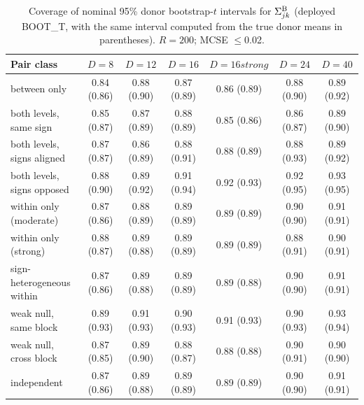 \begin{table}[h]\centering\footnotesize
\caption{Coverage of nominal 95\% donor bootstrap-$t$ intervals for $\Sigma^{\mathrm{B}}_{jk}$ (deployed BOOT\_T, with the same interval computed from the true donor means in parentheses). $R=200$; MCSE $\le$0.02.}\label{tab:cov}
\begin{tabular}{lcccccc}
\hline
Pair class & $D=8$ & $D=12$ & $D=16$ & $D=16 strong$ & $D=24$ & $D=40$\\
\hline
between only & 0.84 (0.86) & 0.88 (0.90) & 0.87 (0.89) & 0.86 (0.89) & 0.88 (0.90) & 0.89 (0.92)\\
both levels, same sign & 0.85 (0.87) & 0.87 (0.89) & 0.88 (0.89) & 0.85 (0.86) & 0.86 (0.87) & 0.89 (0.90)\\
both levels, signs aligned & 0.87 (0.87) & 0.86 (0.89) & 0.88 (0.91) & 0.88 (0.89) & 0.88 (0.93) & 0.89 (0.92)\\
both levels, signs opposed & 0.88 (0.90) & 0.89 (0.92) & 0.91 (0.94) & 0.92 (0.93) & 0.92 (0.95) & 0.93 (0.95)\\
within only (moderate) & 0.87 (0.86) & 0.88 (0.89) & 0.89 (0.89) & 0.89 (0.89) & 0.90 (0.90) & 0.91 (0.91)\\
within only (strong) & 0.88 (0.87) & 0.89 (0.88) & 0.89 (0.89) & 0.89 (0.89) & 0.88 (0.91) & 0.90 (0.91)\\
sign-heterogeneous within & 0.87 (0.86) & 0.89 (0.88) & 0.89 (0.89) & 0.89 (0.88) & 0.90 (0.90) & 0.91 (0.91)\\
weak null, same block & 0.89 (0.93) & 0.91 (0.93) & 0.90 (0.93) & 0.91 (0.93) & 0.90 (0.93) & 0.93 (0.94)\\
weak null, cross block & 0.87 (0.85) & 0.89 (0.90) & 0.88 (0.87) & 0.88 (0.88) & 0.90 (0.91) & 0.90 (0.90)\\
independent & 0.87 (0.86) & 0.89 (0.88) & 0.89 (0.89) & 0.89 (0.89) & 0.90 (0.90) & 0.91 (0.91)\\
\hline
\end{tabular}
\end{table}

